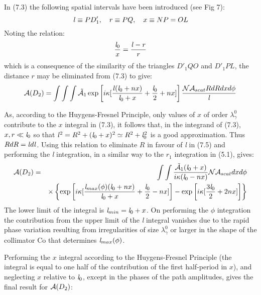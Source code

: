 {    In (7.3) the following spatial intervals have been introduced (see Fig 7):
    \[  {\it l} \equiv PD'_1,~~~ r \equiv PQ,~~~ x \equiv NP = OL \]
   Noting the relation:
    \begin{equation}
      \frac{{\it l}_0}{x} = \frac{{\it l} -r}{r}
    \end{equation}
     which is a consequence of the similarity of the triangles $D'_1QO$ and  $D'_1PL$, the distance $r$ may be
     eliminated from (7.3) to give:
    \begin{equation}
  {\cal A}(D_2) = \int \int \int \tilde{ {\cal A}}_1 
     \exp \left[i \kappa[\frac{{\it l}({\it l}_0+nx)}{{\it l}_0+x}+\frac{{\it l}_0}{2}+nx]\right]
         \frac{{\cal N} {\cal A}_{scat} R dR dx d\phi}{{\it l}}
   \end{equation}

   As, according to the Huygens-Fresnel Principle, only values of $x$ of order $\lambda_{\gamma}^0$ 
   contribute to the $x$ integral in (7.3), it follows that, in the integrand of (7.3),
    $x,r \ll {\it l}_0$ so that ${\it l}^2 =  R^2+({\it l}_0+x)^2 \simeq  R^2+{\it l}_0^2$ is a good
    approximation. Thus $RdR = {\it l} d{\it l}$. Using this relation to 
   eliminate $R$ in favour of {\it l} in (7.5) and performing the {\it l} integration,
    in a similar way to the $r_1$ integration in (5.1), gives:
   \begin{eqnarray}
  {\cal A}(D_2) & = & \int \int \frac{ \tilde{ {\cal A}}_1 ({\it l}_0+x)}{i \kappa ({\it l}_0-nx)}{\cal N} {\cal A}_{scat}
       dx d\phi \nonumber \\
      &   & \times \left\{ \exp \left[i \kappa[\frac{{\it l}_{max}(\phi)({\it l}_0+nx)}{{\it l}_0+x}+\frac{{\it l}_0}{2}-nx]\right]
                  -  \exp \left[i \kappa [\frac{3{\it l}_0}{2}+2nx] \right]\right\}   
   \end{eqnarray}
    The lower limit of the integral is ${\it l}_{min} = {\it l}_0+x$. On performing the $\phi$ integration
    the contribution from the upper limit of the {\it l} integral vanishes due to the rapid phase
     variation resulting from irregularities of size $\lambda_{\gamma}^0$ or larger in the shape of the
    collimator Co that determines ${\it l}_{max}(\phi)$.
    \par Performing the $x$ integral according to the Huygens-Fresnel Principle (the integral is equal to
     one half of the contribution of the first half-period in $x$), and neglecting $x$ relative to ${\it l}_0$,
    except in the phases of the path amplitudes, gives the final result for ${\cal A}(D_2)$:
}
